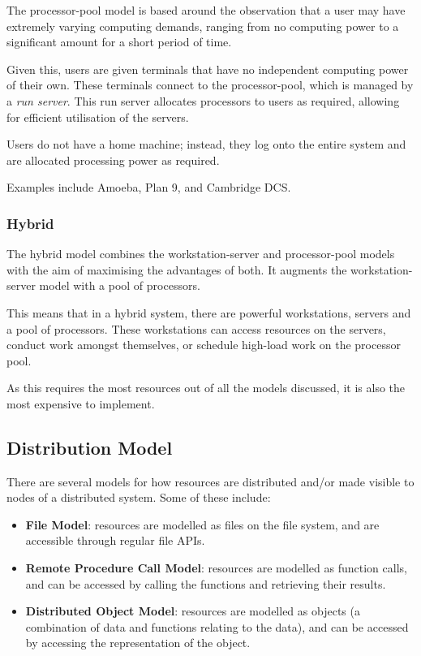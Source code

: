 The processor-pool model is based around the observation that a user may have extremely varying computing demands, ranging from no computing power to a significant amount for a short period of time.

Given this, users are given terminals that have no independent computing power of their own. These terminals connect to the processor-pool, which is managed by a \textit{run server}. This run server allocates processors to users as required, allowing for efficient utilisation of the servers.

Users do not have a home machine; instead, they log onto the entire system and are allocated processing power as required.

Examples include Amoeba, Plan 9, and Cambridge DCS.

\subsubsection{Hybrid}
The hybrid model combines the workstation-server and processor-pool models with the aim of maximising the advantages of both. It augments the workstation-server model with a pool of processors.

This means that in a hybrid system, there are powerful workstations, servers and a pool of processors. These workstations can access resources on the servers, conduct work amongst themselves, or schedule high-load work on the processor pool.

As this requires the most resources out of all the models discussed, it is also the most expensive to implement.

\subsection{Distribution Model}
There are several models for how resources are distributed and/or made visible to nodes of a distributed system. Some of these include:

\begin{itemize}
\item \textbf{File Model}: resources are modelled as files on the file system, and are accessible through regular file APIs.
\item \textbf{Remote Procedure Call Model}: resources are modelled as function calls, and can be accessed by calling the functions and retrieving their results.
\item \textbf{Distributed Object Model}: resources are modelled as objects (a combination of data and functions relating to the data), and can be accessed by accessing the representation of the object.
\end{itemize}


